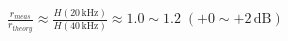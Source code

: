 \documentclass[border=1pt]{standalone}
\begin{document}
\fontsize{14}{16.8}\selectfont
\(\displaystyle \frac{r_{meas}}{r_{theory}} \approx \frac{H(20\,\text{kHz})}{H(40\,\text{kHz})} \approx 1.0\sim 1.2\;(+0\sim +2\,\text{dB})\)
\end{document}
